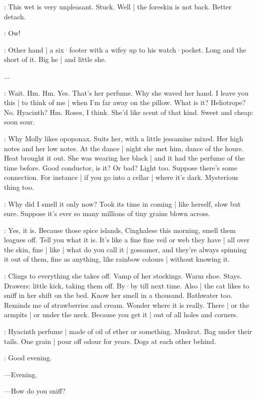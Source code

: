 \BloomCurrent:
This wet is very unpleasant.
Stuck.
Well |
the foreskin is not back.
Better detach.%

\BloomInt:
Ow!

\BloomAbstract:
Other hand |
a six·footer with a wifey up to his watch·pocket.
Long and the short of it.
Big he |
and little she.

...

\BloomCurrent:
Wait.
Hm.
Hm.
Yes.
That's her perfume.
Why she waved her hand.
I leave you this |
to think of me |
when I'm far away on the pillow.
What is it?
Heliotrope?
No.
Hyacinth?
Hm.
Roses,
I think.
She'd like scent of that kind.
Sweet and cheap:
soon sour.%

\BloomHist:
Why Molly likes opoponax.
Suits her,
with a little jessamine mixed.
Her high notes and her low notes.
At the dance |
night she met him,
dance of the hours.
Heat brought it out.
She was wearing her black |
and it had the perfume of the time before.
Good conductor,
is it?
Or bad?
Light too.
Suppose there's some connection.
For instance |
if you go into a cellar |
where it's dark.
Mysterious thing too.

\BloomCurrent:
Why did I smell it only now?
Took its time in coming |
like herself,
slow but sure.
Suppose it's ever so many millions of tiny grains blown across.

\BloomAbstract:
Yes,
it is.
Because those spice islands,
Cinghalese this morning,
smell them leagues off.
Tell you what it is.
It's like a fine fine veil
or web they have |
all over the skin,
fine |
like |
what do you call it |
gossamer,%
and they're always spinning it out of them,
fine as anything,
like rainbow colours |
without knowing it.

\BloomHist:
Clings to everything she takes off.
Vamp of her stockings.
Warm shoe.
Stays.
Drawers:
little kick,
taking them off.
By·by till next time.
Also |
the cat likes to sniff in her shift
on the bed.
Know her smell in a thousand.
Bathwater too.
Reminds me of strawberries and cream.
Wonder where it is really.
There |
or the armpits |
or under the neck.
Because you get it |
out of all holes and corners.

\BloomAbstract:
Hyacinth perfume |
made of oil of ether or something.
Muskrat.
Bag under their tails.
One grain |
pour off odour for years.
Dogs at each other behind.

\BloomOther:
Good evening.

---Evening.

---How do you sniff?

